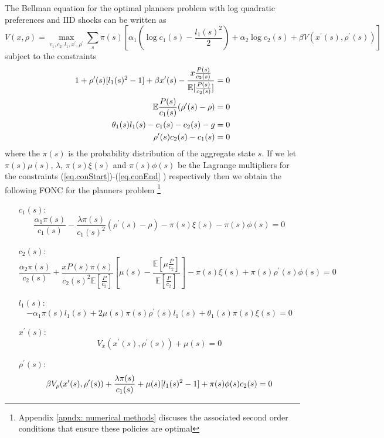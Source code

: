 \documentclass[thmsb,11pt]{article}
\begin{document}
The Bellman equation for the optimal planners problem with log quadratic
preferences and IID shocks can be written as
\begin{equation*}
V(x,\rho) = \max_{c_1,c_2,l_1,x^{\prime },\rho^{\prime }} \sum_s \pi(s)\left[%
\alpha_1\left(\log c_1(s) -\frac{l_1(s)^2}{2}\right)+\alpha_2\log
c_2(s)+\beta V(x^{\prime }(s),\rho^{\prime }(s))\right]
\end{equation*}%
subject to the constraints
\begin{align}
1+\rho^{\prime }(s)[l_1(s)^2-1]+\beta x^{\prime }(s) - \frac{x\frac{P(s)}{%
c_2(s)}}{\mathbb{E}[\frac{P(s)}{c_2(s)}]}=0  \label{eq.conStart} \\
\mathbb{E}\frac{P(s)}{c_1(s)}(\rho^{\prime }(s)-\rho) = 0 \\
\theta_1(s)l_1(s) -c_1(s)-c_2(s)-g = 0 \\
\rho^{\prime }(s) c_2(s)-c_1(s) = 0  \label{eq.conEnd}
\end{align}
where the $\pi(s)$ is the probability distribution of the aggregate state $s$. If
we let $\pi(s)\mu(s)$, $\lambda$, $\pi(s)\xi(s)$ and $\pi(s)\phi(s)$ be the
Lagrange multipliers for the constraints (\ref{eq.conStart})-(\ref{eq.conEnd}%
) respectively then we obtain the following FONC for the planners problem \footnote{Appendix \ref{apndx: numerical methods} discuses the associated second order conditions that ensure these policies are optimal}

\begin{enumerate}
\item[$c_1(s):$]
\begin{equation}
\frac{\alpha_1\pi(s)}{c_1(s)}-\frac{\lambda \pi(s)}{c_1(s)^2}(\rho^{\prime
}(s)-\rho)-\pi(s)\xi(s)-\pi(s)\phi(s) = 0  \label{eq.c1FOC}
\end{equation}

\item[$c_2(s):$]
\begin{equation}
\frac{\alpha_2 \pi(s)}{c_2(s)} + \frac{x P(s)\pi(s)}{c_2(s)^2\mathbb{E}[\frac{P}{c_2}]}%
\left[\mu(s)-\frac{\mathbb{E}[\mu\frac{P}{c_2}]}{\mathbb{E}[\frac{P}{c_2}]}%
\right]-\pi(s)\xi(s)+\pi(s)\rho^{\prime }(s)\phi(s)=0  \label{eq.c2FOC}
\end{equation}

\item[$l_1(s):$]
\begin{equation}
-\alpha_1\pi(s)l_1(s)+2\mu(s)\pi(s)\rho^{\prime
}(s)l_1(s)+\theta_1(s)\pi(s)\xi(s)=0
\end{equation}

\item[$x^{\prime }(s):$]
\begin{equation}
V_x(x^{\prime }(s),\rho^{\prime }(s)) + \mu(s) = 0
\label{eq.x'FOC}
\end{equation}

\item[$\rho^{\prime }(s):$]
\begin{equation}
 \beta V_{\rho}(x^{\prime }(s),\rho^{\prime }(s))+\frac{\lambda \pi(s)}{%
c_1(s)}+\mu(s)[l_1(s)^2-1]+\pi(s)\phi(s)c_2(s) = 0  \label{eq.FOCNend}
\end{equation}
\end{enumerate}
\end{document}
